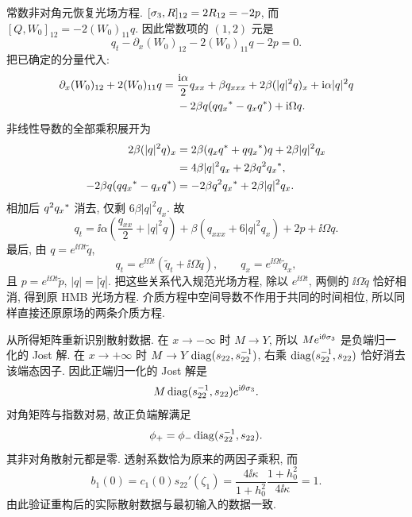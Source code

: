 \par\smallskip\noindent 常数非对角元恢复光场方程.\quad
$[\sigma_3,R]_{12}=2R_{12}=-2p$,
而 $[Q,W_0]_{12}=-2(W_0)_{11}q$.
因此常数项的 $(1,2)$ 元是
\begin{equation*}
q_t-\partial_x(W_0)_{12}-2(W_0)_{11}q-2p=0.
\end{equation*}
把已确定的分量代入:
\begin{equation*}
\begin{aligned}
\partial_x(W_0)_{12}+2(W_0)_{11}q
={}&\dfrac{\mathrm{i}\alpha}{2}q_{xx}+\beta q_{xxx}
+2\beta(|q|^2q)_x+\mathrm{i}\alpha|q|^2q\\
&-2\beta q(q{q_x}^{*}-q_x{q}^{*})
+\mathrm{i}\Omega q.
\end{aligned}
\end{equation*}
非线性导数的全部乘积展开为
\begin{equation*}
\begin{aligned}
2\beta(|q|^2q)_x
&=2\beta(q_x{q}^{*}+q{q_x}^{*})q
+2\beta|q|^2q_x\\
&=4\beta|q|^2q_x+2\beta q^2{q_x}^{*},\\
-2\beta q(q{q_x}^{*}-q_x{q}^{*})
&=-2\beta q^2{q_x}^{*}+2\beta|q|^2q_x.
\end{aligned}
\end{equation*}
相加后 $q^2{q_x}^{*}$ 消去, 仅剩 $6\beta|q|^2q_x$.
故
\begin{equation*}
q_t=\ii\alpha\left(\dfrac{q_{xx}}{2}+|q|^2q\right)
+\beta(q_{xxx}+6|q|^2q_x)+2p+\ii\Omega q.
\end{equation*}
最后, 由 $q=e^{\ii\Omega t}\widetilde q$,
\begin{equation*}
q_t=e^{\ii\Omega t}
(\widetilde q_t+\ii\Omega\widetilde q),\qquad
q_x=e^{\ii\Omega t}\widetilde q_x,
\end{equation*}
且 $p=e^{\ii\Omega t}\widetilde p$, $|q|=|\widetilde q|$.
把这些关系代入规范光场方程, 除以 $e^{\ii\Omega t}$,
两侧的 $\ii\Omega\widetilde q$ 恰好相消, 得到原 HMB 光场方程.
介质方程中空间导数不作用于共同的时间相位,
所以同样直接还原原场的两条介质方程.

\par\smallskip\noindent 从所得矩阵重新识别散射数据.\quad
在 $x\to-\infty$ 时 $M\to Y$,
所以 $Me^{\mathrm{i}\theta\sigma_3}$ 是负端归一化的 Jost 解.
在 $x\to+\infty$ 时
$M\to Y\operatorname{diag}(s_{22},s_{22}^{-1})$,
右乘 $\operatorname{diag}(s_{22}^{-1},s_{22})$ 恰好消去该端态因子.
因此正端归一化的 Jost 解是
\begin{equation*}
M\operatorname{diag}(s_{22}^{-1},s_{22})e^{\mathrm{i}\theta\sigma_3}.
\end{equation*}
对角矩阵与指数对易, 故正负端解满足
\begin{equation*}
\phi_+=\phi_-\operatorname{diag}(s_{22}^{-1},s_{22}).
\end{equation*}
其非对角散射元都是零.
透射系数恰为原来的两因子乘积,
而
\begin{equation*}
b_1(0)=c_1(0)s_{22}'(\zeta_1)
=\dfrac{4\ii\kappa}{1+h_0^2}
\dfrac{1+h_0^2}{4\ii\kappa}=1.
\end{equation*}
由此验证重构后的实际散射数据与最初输入的数据一致.


